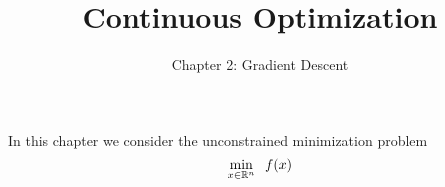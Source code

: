 \documentclass[10pt,a4paper]{article}
\title{Continuous Optimization}
\author{Chapter 2: Gradient Descent}
\date{}
\begin{document}
	\maketitle
	In this chapter we consider the unconstrained minimization problem
	\begin{equation*}
		\min_{x\in\mathbb{R}^n} \;\; f(x)
	\end{equation*}


\end{document}
